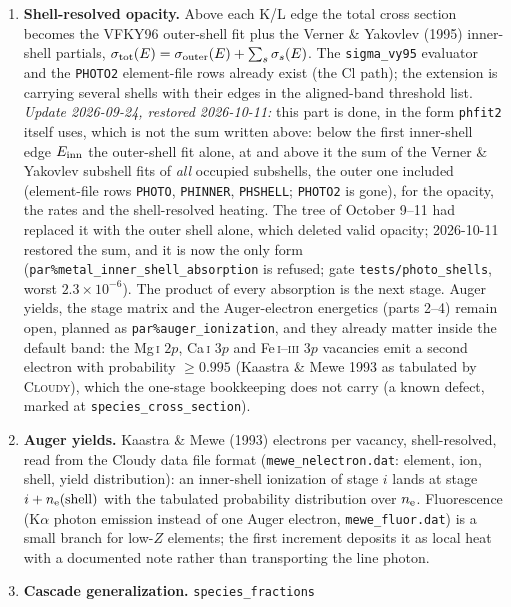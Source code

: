 \documentclass[english,a4paper]{my_memo}
\newcommand{\code}[1]{\texttt{#1}}
\begin{document}
\begin{enumerate}[leftmargin=2em]
\item \textbf{Shell-resolved opacity.}  Above each K/L edge the total
  cross section becomes the VFKY96 outer-shell fit plus the Verner \&
  Yakovlev (1995) inner-shell partials,
  $\sigma_{\rm tot}(E)=\sigma_{\rm outer}(E)+\sum_s\sigma_s(E)$.  The
  \code{sigma\_vy95} evaluator and the \code{PHOTO2} element-file rows
  already exist (the Cl path); the extension is carrying several shells
  with their edges in the aligned-band threshold list.
  \emph{Update 2026-09-24, restored 2026-10-11:} this part is done, in
  the form \code{phfit2} itself uses, which is not the sum written above:
  below the first inner-shell edge $E_{\rm inn}$ the outer-shell fit alone,
  at and above it the sum of the Verner \& Yakovlev subshell fits of
  \emph{all} occupied subshells, the outer one included (element-file rows
  \code{PHOTO}, \code{PHINNER}, \code{PHSHELL}; \code{PHOTO2} is gone), for
  the opacity, the rates and the shell-resolved heating.  The tree of
  October 9--11 had replaced it with the outer shell alone, which deleted
  valid opacity; 2026-10-11 restored the sum, and it is now the only form
  (\code{par\%metal\_inner\_shell\_absorption} is refused; gate
  \code{tests/photo\_shells}, worst $2.3\times10^{-6}$).  The product of every
  absorption is the next stage.  Auger yields, the stage matrix and the
  Auger-electron energetics (parts 2--4) remain open, planned as
  \code{par\%auger\_ionization}, and they already matter inside the
  default band: the Mg\,\textsc{i} $2p$, Ca\,\textsc{i} $3p$ and
  Fe\,\textsc{i}--\textsc{iii} $3p$ vacancies emit a second electron with
  probability $\ge 0.995$ (Kaastra \& Mewe 1993 as tabulated by
  \textsc{Cloudy}), which the one-stage bookkeeping does not carry (a
  known defect, marked at \code{species\_cross\_section}).
\item \textbf{Auger yields.}  Kaastra \& Mewe (1993) electrons per
  vacancy, shell-resolved, read from the Cloudy data file format
  (\code{mewe\_nelectron.dat}: element, ion, shell, yield
  distribution): an inner-shell ionization of stage $i$ lands at stage
  $i+n_{\rm e}({\rm shell})$ with the tabulated probability
  distribution over $n_{\rm e}$.  Fluorescence (K$\alpha$ photon
  emission instead of one Auger electron, \code{mewe\_fluor.dat}) is
  a small branch for low-$Z$ elements; the first increment deposits it
  as local heat with a documented note rather than transporting the
  line photon.
\item \textbf{Cascade generalization.}  \code{species\_fractions}

\end{enumerate}
\end{document}
